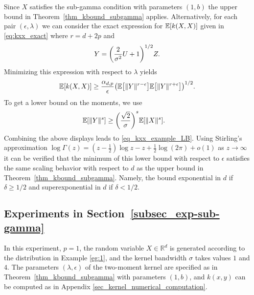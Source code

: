 \documentclass{article}
\theoremstyle{definition}
\newcommand{\reals}{\mathbb{R}}
\newcommand{\ex}[1]{\ensuremath{\mathbb{E}\left[ #1\right]}}
\newcommand{\eps}{\epsilon}
\let\originalleft\left
\let\originalright\right
\renewcommand{\left}{\mathopen{}\mathclose\bgroup\originalleft}
\renewcommand{\right}{\aftergroup\egroup\originalright}
\begin{document}
Since $X$ satisfies the sub-gamma condition with parameters $(1,b)$  the upper bound in Theorem~\ref{thm_kbound_subgamma} applies. Alternatively, for each pair $(\eps, \lambda)$ we can consider the exact expression for $\ex{k(X,X)}$ given in \eqref{eq:kxx_exact} 
where $r= d + 2p$ and
\[
Y = \left( \frac{2}{\sigma^2} U + 1\right)^{1/2} Z.
\]
Minimizing this expression with respect to $\lambda$ yields
\begin{align}
 \ex{ k(X,X) } \ge \frac{ \alpha_{d,p}  }{ \eps} \left( \ex{ \| Y\|^{r -\eps} } \ex{ \|Y\|^{r + \eps} }  \right)^{1/2} .
 \end{align}
To get a lower bound on the moments, we use
\begin{align}
    \ex{ \|Y\|^s} & \ge \left(\frac{\sqrt{2}}{\sigma} \right)^s \ex{ \|X\|^s} .
\end{align}
Combining the above displays leads to \eqref{eq_kxx_example_LB}. 
Using Stirling's approximation $\log \Gamma(z) = (z -\frac{1}{2}) \log z  - z + \frac{1}{2} \log(2 \pi) + o(1)$ as $z \to \infty$ it can be verified that  the minimum of this lower bound with respect to $\eps$ satisfies the same scaling behavior with respect to $d$ as the upper bound in Theorem~\ref{thm_kbound_subgamma}. Namely, the bound exponential in $d$ if $\delta \ge 1/2$ and superexponential in $d$ if $\delta < 1/2$.


\subsection{Experiments in Section~\ref{subsec_exp-sub-gamma}}


In this experiment, $p=1$, the random variable $X \in \reals^d$ is generated according to the distribution in Example \ref{eg:1},
and  the kernel bandwidth $\sigma$ takes values  $1$ and $4$. The parameters $(\lambda, \eps)$ of the two-moment kernel are specified as in Theorem~\ref{thm_kbound_subgamma} with parameters $(1,b)$, and $k(x,y)$ can be computed as in Appendix \ref{sec_kernel_numerical_computation}.
\end{document}
